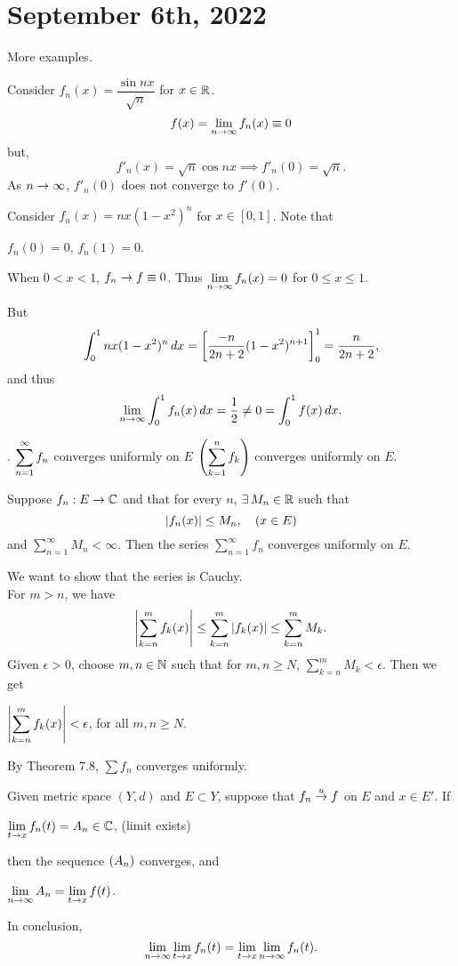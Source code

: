\section*{September 6th, 2022}

More examples.

 Consider \(f_n(x) = \dfrac{\sin nx}{\sqrt{n}}\) for \(x \in \mathbb{R}\).
\[
    f(x) = \lim_{n\rightarrow\infty} f_n(x) \equiv 0
\]
but,
\[
    f'_n(x) = \sqrt{n}\cos nx \implies f'_n(0) = \sqrt{n}.
\]
As \(n \rightarrow \infty\), \(f'_n(0)\) does not converge to \(f'(0)\).

 Consider \(f_n(x) = nx(1-x^2)^n\) for \(x \in [0, 1]\). Note that
\begin{center}
    \(f_n(0) = 0\), \(f_n(1) = 0\).
\end{center}
When \(0 < x < 1\), \(f_n \rightarrow f \equiv 0\).  Thus \(\displaystyle \lim_{n\rightarrow \infty} f_n(x) = 0\) for \(0 \leq x \leq 1\).

But
\[
    \int_0^1 nx(1-x^2)^n \,d{x} = \left[\frac{-n}{2n+2} (1-x^2)^{n+1}\right]_0^1 = \frac{n}{2n+2},
\]
and thus
\[
    \lim_{n\rightarrow \infty} \int_0^1 f_n(x) \,d{x} = \frac{1}{2} \neq 0 = \int_0^1 f(x)\,d{x}.
\]

. \(\displaystyle \sum_{n=1}^\infty f_n\) converges uniformly on \(E\) \miff \(\displaystyle \left( \sum_{k=1}^n f_k \right)\) converges uniformly on \(E\).

  Suppose \(f_n: E \rightarrow \mathbb{C}\) and that for every \(n\), \(\exists M_n \in \R\) such that
\[
    \left| f_n(x) \right| \leq M_n, \quad (x \in E)
\]
and \(\sum_{n=1}^\infty M_n < \infty\). Then the series \(\sum_{n=1}^\infty f_n\) converges uniformly on \(E\).

\pf We want to show that the series is Cauchy.\\
For \(m > n\), we have
\[
    \left| \sum_{k=n}^m f_k(x) \right| \leq \sum_{k=n}^m \left| f_k(x) \right| \leq \sum_{k=n}^m M_k.
\]
Given \(\epsilon > 0\), choose \(m, n \in \mathbb{N}\) such that for \(m, n \geq N\), \(\sum_{k = n}^m M_k < \epsilon\). Then we get
\begin{center}
    \(\displaystyle \left| \sum_{k=n}^m f_k(x) \right| < \epsilon\), for all \(m, n\geq N\).
\end{center}
By Theorem 7.8, \(\sum f_n\) converges uniformly.

 Given metric space \((Y, d)\) and \(E \subset Y\), suppose that \(f_n \overset{u}{\rightarrow} f\) on \(E\) and \(x \in E'\). If
\begin{center}
    \(\displaystyle \lim_{t \rightarrow x} f_n(t) = A_n \in \mathbb{C}\), \quad (limit exists)
\end{center}
then the sequence \(\left( A_n \right)\) converges, and
\begin{center}
    \(\displaystyle \lim_{n \rightarrow \infty} A_n = \lim_{t \rightarrow x} f(t)\).
\end{center}
In conclusion,
\[
    \lim_{n\rightarrow \infty} \lim_{t \rightarrow x} f_n(t) = \lim_{t\rightarrow x}\lim_{n\rightarrow\infty} f_n(t).
\]

